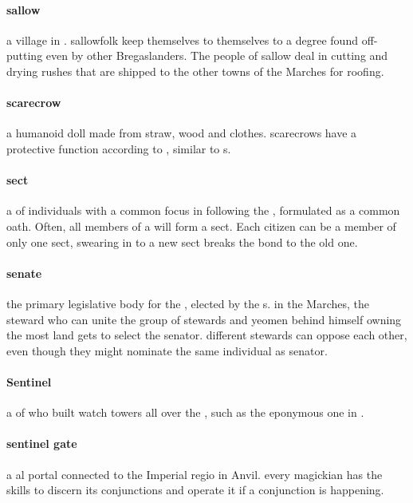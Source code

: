 \paragraph{sallow} a village in . sallowfolk keep themselves to themselves to a degree found off-putting even by other Bregaslanders. The people of sallow deal in cutting and drying rushes that are shipped to the other towns of the Marches for roofing. 
\paragraph{scarecrow} a humanoid doll made from straw, wood and clothes. scarecrows have a protective function according to , similar to s.
\paragraph{sect} a  of individuals with a common focus in following the , formulated as a common oath. Often, all members of a  will form a sect. Each citizen can be a member of only one sect, swearing in to a new sect breaks the bond to the old one. 
\paragraph{senate} the primary legislative body for the , elected by the s. in the Marches, the steward who can unite the group of stewards and yeomen behind himself owning the most land gets to select the senator. different stewards can oppose each other, even though they might nominate the same individual as senator.
\paragraph{Sentinel} a  of  who built watch towers all over the , such as the eponymous one in . 
\paragraph{sentinel gate} a al portal connected to the Imperial regio in Anvil. every magickian has the skills to discern its conjunctions and operate it if a conjunction is happening.
